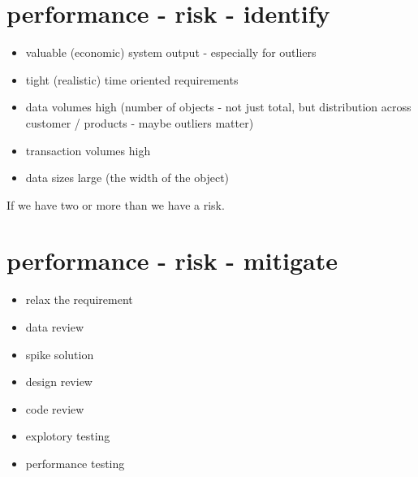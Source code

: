 \section*{performance - risk - identify}
\begin{itemize}
\item valuable (economic) system output - especially for outliers
\item tight (realistic) time oriented requirements
\item data volumes high (number of objects - not just total, but distribution across customer / products - maybe outliers matter)
\item transaction volumes high
\item data sizes large (the width of the object)
\end{itemize}

If we have two or more than we have a risk.

\clearpage
\section*{performance - risk - mitigate}
\begin{itemize}
\item relax the requirement
\item data review
\item spike solution
\item design review
\item code review
\item explotory testing
\item performance testing
\end{itemize}
